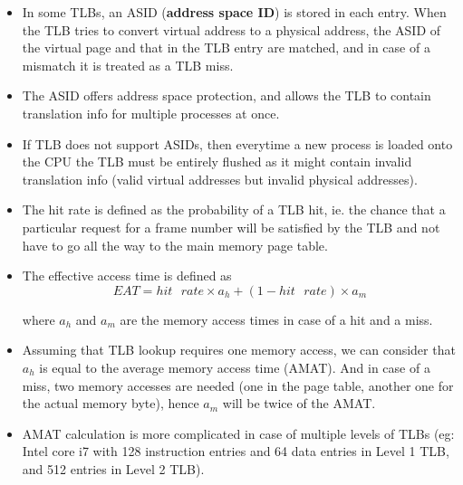 \documentclass{article}
\theoremstyle{plain}
\theoremstyle{definition}
\begin{document}
\begin{itemize}
    \item In some TLBs, an ASID (\textbf{address space ID}) is stored in each entry. When the TLB tries to convert virtual address to a physical address, the ASID of the virtual page and that in the TLB entry are matched, and in case of a mismatch it is treated as a TLB miss. 
    
    \item The ASID offers address space protection, and allows the TLB to contain translation info for multiple processes at once. 
    
    \item If TLB does not support ASIDs, then everytime a new process is loaded onto the CPU the TLB must be entirely flushed as it might contain invalid translation info (valid virtual addresses but invalid physical addresses).
    
    \item The hit rate is defined as the probability of a TLB hit, ie. the chance that a particular request for a frame number will be satisfied by the TLB and not have to go all the way to the main memory page table. 
    
    \item The effective access time is defined as
    \begin{equation*}
        EAT = hit\text{ }rate \times a_h + (1-hit\text{ }rate)\times a_m
    \end{equation*}
    
    where $a_h$ and $a_m$ are the memory access times in case of a hit and a miss. 
    
    \item Assuming that TLB lookup requires one memory access, we can consider that $a_h$ is equal to the average memory access time (AMAT). And in case of a miss, two memory accesses are needed (one in the page table, another one for the actual memory byte), hence $a_m$ will be twice of the AMAT. 
    
    \item AMAT calculation is more complicated in case of multiple levels of TLBs (eg: Intel core i7 with 128 instruction entries and 64 data entries in Level 1 TLB, and 512 entries in Level 2 TLB). 
\end{itemize}
\end{document}
